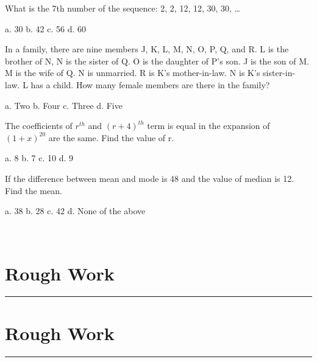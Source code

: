 \documentclass[a4paper, addpoints]{exam}
\begin{document}
\begin{questions}
	\question What is the 7th number of the sequence: 2, 2, 12, 12, 30, 30, …\\
	
	\begin{oneparcheckboxes}
		\choice a. 30
		\choice b. 42
		\choice c. 56
		\choice d. 60
	\end{oneparcheckboxes}
	
	\question In a family, there are nine members J, K, L, M, N, O, P, Q, and R. L is the brother of N, N is the sister of Q. O is the daughter of P's son. J is the son of M. M is the wife of Q. N is unmarried. R is K's mother-in-law. N is K's sister-in- law. L has a child.
How many female members are there in the family?\\

	\begin{oneparcheckboxes}
		\choice a. Two
		\choice b. Four
		\choice c. Three
		\choice d. Five
	\end{oneparcheckboxes}
	\question The coefficients of $r^{th}$ and $(r+4)^{th}$ term is equal in the expansion of $(1+x)^{20}$ are the same. Find the value of r.\\

	\begin{oneparcheckboxes}
		\choice a. 8
		\choice b. 7
		\choice c. 10
		\choice d. 9
	\end{oneparcheckboxes}
	
	\question If the difference between mean and mode is 48 and the value of median is 12. Find the mean.\\
	
	\begin{oneparcheckboxes}
		\choice a. 38
		\choice b. 28
		\choice c. 42
		\choice d. None of the above
	\end{oneparcheckboxes}\\
	\section*{{Rough Work}}
	\hrule
	\pagebreak
	\section*{{Rough Work}}
	\hrule
\end{questions}
\end{document}
